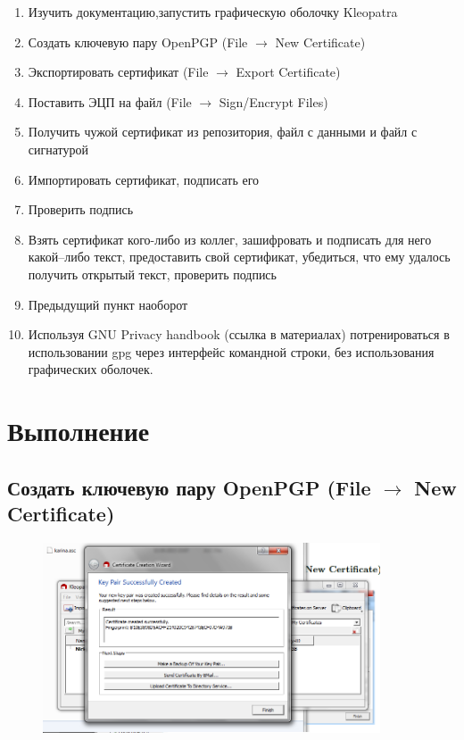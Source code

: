 \documentclass[utf8x, 12pt]{G7-32}
\begin{document}
\begin{enumerate}
	\item Изучить документацию,запустить графическую оболочку Kleopatra
	\item Создать ключевую пару OpenPGP (File $\rightarrow$ New Certificate)
	\item Экспортировать сертификат (File $\rightarrow$ Export Certificate)
	\item Поставить ЭЦП на файл (File $\rightarrow$ Sign/Encrypt Files)
	\item Получить чужой сертификат из репозитория, файл с данными и файл с сигнатурой
	\item Импортировать сертификат, подписать его
	\item Проверить подпись
	\item Взять сертификат кого-либо из коллег, зашифровать и подписать для него какой--либо текст, предоставить свой сертификат, убедиться, что ему удалось получить открытый текст, проверить подпись
	\item Предыдущий пункт наоборот
	\item Используя GNU Privacy handbook (ссылка в материалах) потренироваться в использовании gpg через интерфейс командной строки, без использования графических оболочек.
\end{enumerate}


\chapter{Выполнение}

\section{Создать ключевую пару OpenPGP (File $\rightarrow$ New Certificate)}

\begin{figure}[hhh!]
	\begin{center}
		\includegraphics[width=10cm]{img2/21}
		
	\end{center}
\end{figure}	
\end{document}
